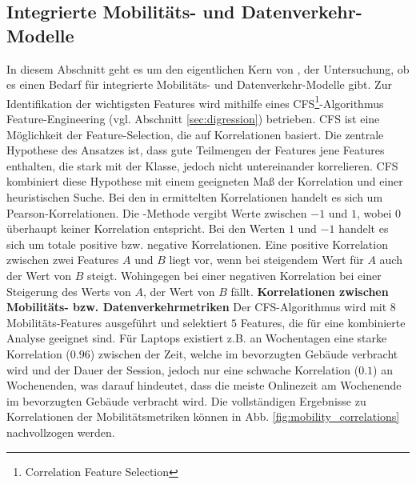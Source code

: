 \documentclass[12pt, a4paper]{article}
\begin{document}
\subsection{Integrierte Mobilitäts- und Datenverkehr-Modelle}
\label{sec:phase3}

In diesem Abschnitt geht es um den eigentlichen Kern von \cite{Alipour2018}, der Untersuchung, ob es einen Bedarf
für integrierte Mobilitäts- und Datenverkehr-Modelle gibt. Zur Identifikation der wichtigsten Features wird
mithilfe eines \textsc{CFS}\footnote{Correlation Feature Selection}-Algorithmus
Feature-Engineering (vgl. Abschnitt \ref{sec:digression}) betrieben. \textsc{CFS} ist eine Möglichkeit der Feature-Selection,
die auf Korrelationen basiert. Die zentrale Hypothese des Ansatzes ist, dass gute Teilmengen der Features jene Features enthalten,
die stark mit der Klasse, jedoch nicht untereinander korrelieren. \textsc{CFS} kombiniert diese Hypothese mit einem geeigneten
Maß der Korrelation und einer heuristischen Suche. \cite{Hall2000}
Bei den in \cite{Alipour2018} ermittelten Korrelationen handelt es sich um Pearson-Korrelationen.
Die -Methode vergibt Werte zwischen $-1$ und $1$, wobei $0$ überhaupt keiner Korrelation
entspricht. Bei den Werten $1$ und $-1$ handelt es sich um totale positive bzw. negative Korrelationen.
Eine positive Korrelation zwischen zwei Features $A$ und $B$ liegt vor, wenn bei steigendem Wert für $A$
auch der Wert von $B$ steigt. Wohingegen bei einer negativen Korrelation bei einer Steigerung des Werts von $A$, 
der Wert von $B$ fällt. \cite{Nettleton2014}
\newline\newline\newline
\textbf{Korrelationen zwischen Mobilitäts- bzw. Datenverkehrmetriken}
\newline\newline
Der \textsc{CFS}-Algorithmus wird mit $8$ Mobilitäts-Features ausgeführt und selektiert $5$ Features, 
die für eine kombinierte Analyse geeignet sind. Für Laptops existiert z.B. an Wochentagen eine starke Korrelation ($0.96$)
zwischen der Zeit, welche im bevorzugten Gebäude verbracht wird und der Dauer der Session, jedoch nur eine schwache Korrelation
($0.1$) an Wochenenden, was darauf hindeutet, dass die meiste Onlinezeit am Wochenende im bevorzugten
Gebäude verbracht wird. \cite{Alipour2018} Die vollständigen Ergebnisse zu Korrelationen der Mobilitätsmetriken können in
Abb. \ref{fig:mobility_correlations} nachvollzogen werden.\newline
\end{document}
